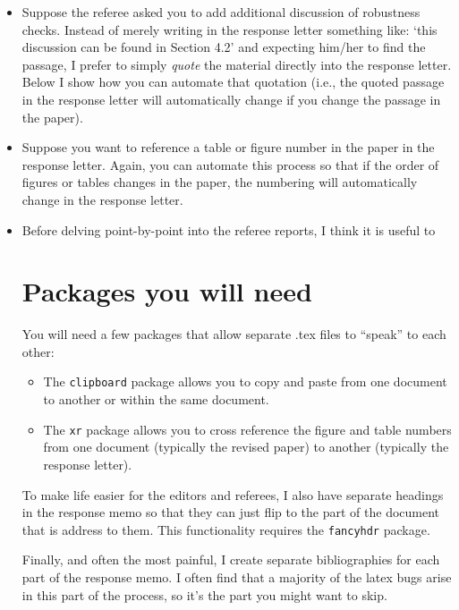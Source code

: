\documentclass[12pt,pdftex, notitlepage]{article}
\begin{document}
\begin{itemize}

\item Suppose the referee asked you to add additional discussion of robustness checks.  Instead of merely writing in the response letter something like: `this discussion can be found in Section 4.2' and expecting him/her to find the passage, I prefer to simply \textit{quote} the material directly into the response letter.  Below I show how you can automate that quotation (i.e., the quoted passage in the response letter will automatically change if you change the passage in the paper).

\item Suppose you want to reference a table or figure number in the paper in the response letter.  Again, you can automate this process so that if the order of figures or tables changes in the paper, the numbering will automatically change in the response letter.

\item Before delving point-by-point into the referee reports, I think it is useful to 


\section{Packages you will need}

You will need a few packages that allow separate .tex files to ``speak'' to each other:

\begin{itemize}
\item The \texttt{clipboard} package allows you to copy and paste from one document to another or within the same document.

\item The \texttt{xr} package allows you to cross reference the figure and table numbers from one document (typically the revised paper) to another (typically the response letter).

\end{itemize}

To make life easier for the editors and referees, I also have separate headings in the response memo so that they can just flip to the part of the document that is address to them. This functionality requires the \texttt{fancyhdr} package.

Finally, and often the most painful, I create separate bibliographies for each part of the response memo.  I often find that a majority of the latex bugs arise in this part of the process, so it's the part you might want to skip.  


\end{itemize}
\end{document}
